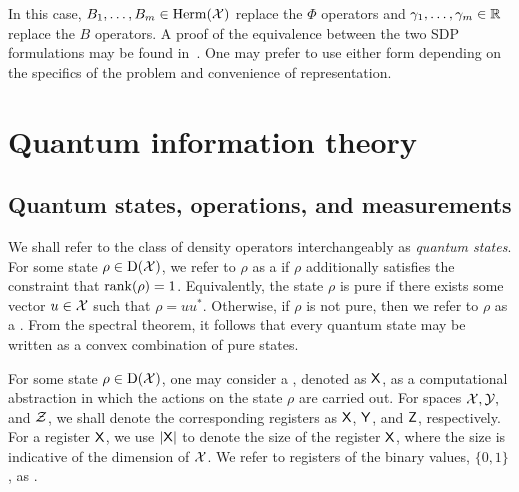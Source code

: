 In this case, $B_1, \ldots, B_m \in \mathrm{Herm}(\mathcal{X})$ replace the $\Phi$ operators and $\gamma_1, \ldots, \gamma_m \in \mathbb{R}$ replace the $B$ operators. A proof of the equivalence between the two SDP formulations may be found in~\cite{Watrous2004}. One may prefer to use either form depending on the specifics of the problem and convenience of representation. 

\section{Quantum information theory}

\subsection{Quantum states, operations, and measurements}

We shall refer to the class of density operators interchangeably as \emph{quantum states}. For some state $\rho \in \mathrm{D}(\mathcal{X})$, we refer to $\rho$ as a  if $\rho$ additionally satisfies the constraint that $\operatorname{rank}(\rho) = 1$. Equivalently, the state $\rho$ is pure if there exists some vector $u \in \mathcal{X}$ such that $\rho = uu^*$. Otherwise, if $\rho$ is not pure, then we refer to $\rho$ as a . From the spectral theorem, it follows that every quantum state may be written as a convex combination of pure states.  

For some state $\rho \in \mathrm{D}(\mathcal{X})$, one may consider a , denoted as $\mathsf{X}$, as a computational abstraction in which the actions on the state $\rho$ are carried out. For spaces $\mathcal{X}, \mathcal{Y},$ and $\mathcal{Z}$, we shall denote the corresponding registers as $\mathsf{X}$, $\mathsf{Y}$, and $\mathsf{Z}$, respectively. For a register $\mathsf{X}$, we use $\left\lvert \mathsf{X} \right\rvert$ to denote the size of the register $\mathsf{X}$, where the size is indicative of the dimension of $\mathcal{X}$. We refer to registers of the binary values, $\{0,1\}$, as . 

